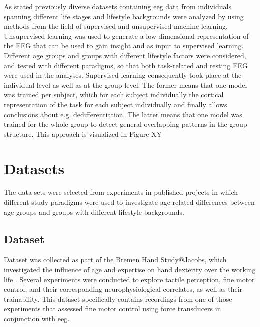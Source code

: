 As stated previously diverse datasets containing \gls{eeg} data from individuals spanning different life stages and lifestyle backgrounds were analyzed by using methods from the field of supervised and unsupervised machine learning. Unsupervised learning was used to generate a low-dimensional representation of the EEG that can be used to gain insight and as input to supervised learning. Different age groups and groups with different lifestyle factors were considered, and tested with different paradigms, so that both task-related and resting EEG were used in the analyses. Supervised learning consequently took place at the individual level as well as at the group level. The former means that one model was trained per subject, which for each subject individually the cortical representation of the task for each subject individually and finally allows conclusions about e.g. dedifferentiation. The latter means that one model was trained for the whole group to detect general overlapping patterns in the group structure. This approach is visualized in Figure XY

\section{Datasets}
The data sets were selected from experiments in published projects in which different study paradigms were used to investigate age-related differences between age groups and groups with different lifestyle backgrounds.

\subsection{Dataset }
Dataset  was collected as part of the Bremen Hand Study@Jacobs, which investigated the influence of age and 
expertise on hand dexterity over the working life \cite{Voelcker-Rehage2013}. Several experiments were conducted to explore tactile perception, fine motor control, and their corresponding neurophysiological correlates, as well as their trainability. This dataset specifically contains recordings from one of those experiments that assessed fine motor control using force transducers in conjunction with \gls{eeg}. 

